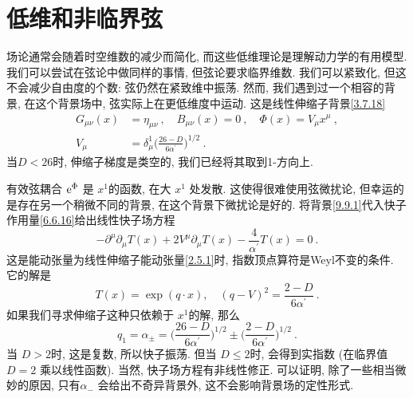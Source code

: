 \section{低维和非临界弦}  \label{sec:9.9}%

场论通常会随着时空维数的减少而简化, 而这些低维理论是理解动力学的有用模型. 我们可以尝试在弦论中做同样的事情, 但弦论要求临界维数. 
我们可以紧致化, 但这不会减少自由度的个数: 弦仍然在紧致维中振荡. 然而, 我们遇到过一个相容的背景, 在这个背景场中, 弦实际上在更低维度中运动. 
这是线性伸缩子背景\eqref{3.7.18}
\begin{subequations} \label{9.9.1}
\begin{align}
		G_{\mu \nu}(x) &= \eta_{\mu \nu} \:, \quad B_{\mu \nu}(x) = 0 \:, \quad \Phi(x)=V_{\mu} x^{\mu}  \:, \label{9.9.1a}	\\
		V_{\mu} &= \delta_{\mu}^{1} \biggl(\frac{26-D}{6 \alpha^{\prime}}\biggr)^{1/2} \:. \label{9.9.1b}
\end{align}
\end{subequations}
当$D<26$时, 伸缩子梯度是类空的, 我们已经将其取到1-方向上.

有效弦耦合 $\mathrm{e}^{\Phi}$ 是 $x^{1}$的函数, 在大 $x^{1}$ 处发散. 这使得很难使用弦微扰论, 但幸运的是存在另一个稍微不同的背景, 在这个背景下微扰论是好的. 
将背景\eqref{9.9.1}代入快子作用量\eqref{6.6.16}给出线性快子场方程
\begin{equation}
	-\partial^{\mu} \partial_{\mu} T(x)+2 V^{\mu} \partial_{\mu} T(x)-\frac{4}{\alpha^{\prime}} T(x)=0 \:. \label{9.9.2}
\end{equation}
这是能动张量为线性伸缩子能动张量\eqref{2.5.1}时, 指数顶点算符是Weyl不变的条件. 它的解是
\begin{equation}
	T(x)=\exp (q \cdot x), \quad (q-V)^{2}=\frac{2-D}{6 \alpha^{\prime}} \:. \label{9.9.3}
\end{equation}
如果我们寻求伸缩子这种只依赖于 $x^{1}$的解, 那么
\begin{equation}
	q_{1}=\alpha_{\pm}=\biggl(\frac{26-D}{6 \alpha^{\prime}}\biggr)^{1/2} \pm \biggl(\frac{2-D}{6 \alpha^{\prime}}\biggr)^{1/2} \:. 
	\label{9.9.4}
\end{equation}
当 $D>2$时, 这是复数, 所以快子振荡. 但当 $D \leq 2$时, 会得到实指数 (在临界值 $D=2$ 乘以线性函数). 
当然, 快子场方程有非线性修正. 可以证明, 除了一些相当微妙的原因, 只有$\alpha_{-}$ 会给出不奇异背景外, 这不会影响背景场的定性形式.

